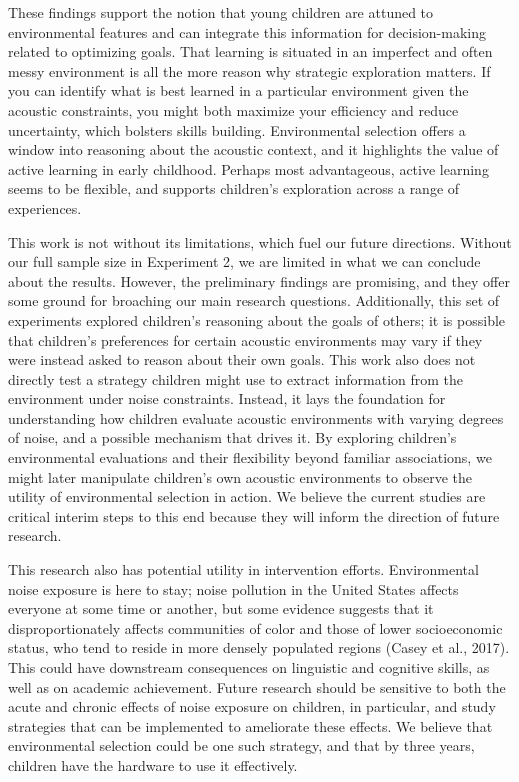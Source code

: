 \documentclass[10pt, letterpaper]{article}
\begin{document}
These findings support the notion that young children are attuned to
environmental features and can integrate this information for
decision-making related to optimizing goals. That learning is situated
in an imperfect and often messy environment is all the more reason why
strategic exploration matters. If you can identify what is best learned
in a particular environment given the acoustic constraints, you might
both maximize your efficiency and reduce uncertainty, which bolsters
skills building. Environmental selection offers a window into reasoning
about the acoustic context, and it highlights the value of active
learning in early childhood. Perhaps most advantageous, active learning
seems to be flexible, and supports children's exploration across a range
of experiences.

This work is not without its limitations, which fuel our future
directions. Without our full sample size in Experiment 2, we are limited
in what we can conclude about the results. However, the preliminary
findings are promising, and they offer some ground for broaching our
main research questions. Additionally, this set of experiments explored
children's reasoning about the goals of others; it is possible that
children's preferences for certain acoustic environments may vary if
they were instead asked to reason about their own goals. This work also
does not directly test a strategy children might use to extract
information from the environment under noise constraints. Instead, it
lays the foundation for understanding how children evaluate acoustic
environments with varying degrees of noise, and a possible mechanism
that drives it. By exploring children's environmental evaluations and
their flexibility beyond familiar associations, we might later
manipulate children's own acoustic environments to observe the utility
of environmental selection in action. We believe the current studies are
critical interim steps to this end because they will inform the
direction of future research.

This research also has potential utility in intervention efforts.
Environmental noise exposure is here to stay; noise pollution in the
United States affects everyone at some time or another, but some
evidence suggests that it disproportionately affects communities of
color and those of lower socioeconomic status, who tend to reside in
more densely populated regions (Casey et al., 2017). This could have
downstream consequences on linguistic and cognitive skills, as well as
on academic achievement. Future research should be sensitive to both the
acute and chronic effects of noise exposure on children, in particular,
and study strategies that can be implemented to ameliorate these
effects. We believe that environmental selection could be one such
strategy, and that by three years, children have the hardware to use it
effectively.
\end{document}
